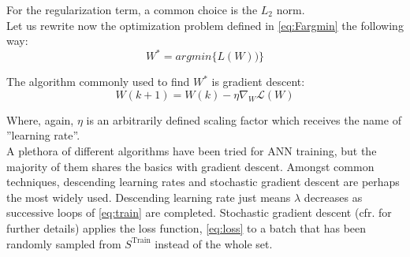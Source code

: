 For the regularization term, a common choice is the $L_2$ norm.\\
%
\indent Let us rewrite now the optimization problem defined in \cref{eq:Fargmin} the following way:
\begin{equation}
	W^* = argmin\{L(W))\}
\end{equation}

The algorithm commonly used to find $W^*$ is gradient descent:
\begin{equation}\label{eq:train}
	W(k+1)=W(k)-\eta\nabla_W\mathcal{L}(W)
\end{equation}

Where, again, $\eta$ is an arbitrarily defined scaling factor which receives the name of ''learning rate''.\\
%
\indent A plethora of different algorithms have been tried for ANN training, but the majority of them shares the basics with gradient descent. Amongst common techniques, descending learning rates and stochastic gradient descent are perhaps the most widely used. Descending learning rate just means $\lambda$ decreases as successive loops of \cref{eq:train} are completed. Stochastic gradient descent (cfr. \cite{Marsland2015Machine} for further details) applies the loss function, \cref{eq:loss} to a batch that has been randomly sampled from $S^\text{Train}$ instead of the whole set.
%

